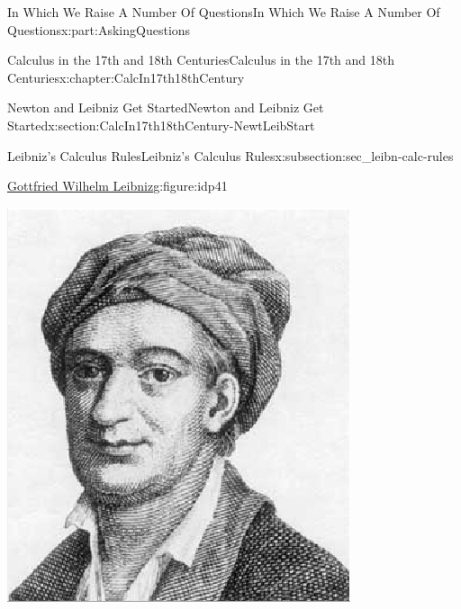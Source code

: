 \documentclass[oneside,10pt,]{book}
\numberwithin{equation}{section}
\begin{document}
\begin{partptx}{In Which We Raise A Number Of Questions}{}{In Which We Raise A Number Of Questions}{}{}{x:part:AskingQuestions}
%
\typeout{************************************************}
\typeout{************************************************}
%
\begin{chapterptx}{Calculus in the 17th and 18th Centuries}{}{Calculus in the 17th and 18th Centuries}{}{}{x:chapter:CalcIn17th18thCentury}
%
%
\typeout{************************************************}
\typeout{************************************************}
%
\begin{sectionptx}{Newton and Leibniz Get Started}{}{Newton and Leibniz Get Started}{}{}{x:section:CalcIn17th18thCentury-NewtLeibStart}
%
%
\typeout{************************************************}
\typeout{************************************************}
%
\begin{subsectionptx}{Leibniz's Calculus Rules}{}{Leibniz's Calculus Rules}{}{}{x:subsection:sec_leibn-calc-rules}
\begin{figureptx}{\href{https://mathshistory.st-andrews.ac.uk/Biographies/Leibniz/}{Gottfried Wilhelm Leibniz}\protect\footnotemark{}}{g:figure:idp41}{}%
%
\begin{image}{0.325}{0.35}{0.325}%
\includegraphics[width=\linewidth]{images/Leibniz.png}

\end{image}
\end{figureptx}
\end{subsectionptx}
\end{sectionptx}
\end{chapterptx}
\end{partptx}
\end{document}
